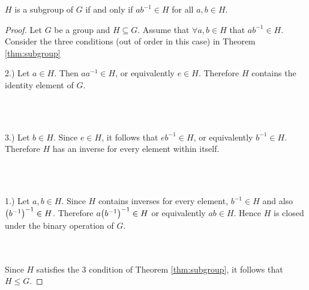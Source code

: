 \documentclass[../notes.tex]{subfiles}
\begin{document}
\begin{theorem}
	\label{thm:subgroupcondition}
	$H$ is a subgroup of $G$ if and only if $ab^{-1} \in H$ for all $a,b \in H$.
\end{theorem}
\begin{proof}
	Let $G$ be a group and $H \subseteq G$. Assume that $\forall a,b \in H$ that $ab^{-1} \in H$. Consider the three conditions (out of order in this case) in Theorem \ref{thm:subgroup} \\

	\quad\begin{minipage}{\dimexpr\textwidth-2cm}
		2.) \;
		Let $a \in H$. Then $a a^{-1} \in H$, or equivalently $e \in H$. Therefore $H$ contains the identity element of $G$.
	\end{minipage} \\
	\\

	\quad\begin{minipage}{\dimexpr\textwidth-2cm}
		3.) \;
		Let $b \in H$. Since $e \in H$, it follows that $eb^{-1} \in H$, or equivalently $b^{-1} \in H$. Therefore $H$ has an inverse for every element within itself.
	\end{minipage} \\
	\\

	\quad\begin{minipage}{\dimexpr\textwidth-2cm}
		1.) \;
		Let $a,b \in H$. Since $H$ contains inverses for every element, $b^{-1} \in H$ and also $\qty(b^{-1})^{-1} \in H$. Therefore $a\qty(b^{-1})^{-1} \in H$ or equivalently $ab \in H$. Hence $H$ is closed under the binary operation of $G$.
	\end{minipage} \\
	\\

	Since $H$ satisfies the $3$ condition of Theorem \ref{thm:subgroup}, it follows that $H \leq G$.
\end{proof}
\end{document}
